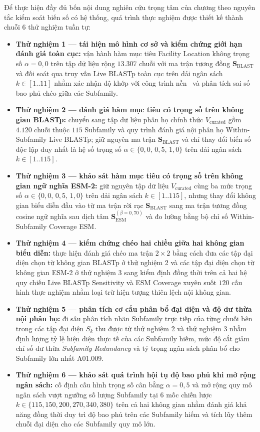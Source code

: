 Để thực hiện đầy đủ bốn nội dung nghiên cứu trọng tâm của chương theo nguyên tắc kiểm soát biến số có hệ thống, quá trình thực nghiệm được thiết kế thành chuỗi 6 thử nghiệm tuần tự:
\begin{itemize}[leftmargin=1.5cm, itemsep=3pt, topsep=4pt]
    \item \textbf{Thử nghiệm 1 --- tái hiện mô hình cơ sở và kiểm chứng giới hạn đánh giá toàn cục:} vận hành hàm mục tiêu Facility Location không trọng số $\alpha = 0{,}0$ trên tập dữ liệu rộng $13.307$ chuỗi với ma trận tương đồng $\mathbf{S}_{\text{BLAST}}$ và đối soát qua truy vấn Live BLASTp toàn cục trên dải ngân sách $k \in [1..11]$ nhằm xác nhận độ khớp với công trình nền~\cite{nguyen2025} và phân tích sai số bao phủ chéo giữa các Subfamily.
    \item \textbf{Thử nghiệm 2 --- đánh giá hàm mục tiêu có trọng số trên không gian BLASTp:} chuyển sang tập dữ liệu phân họ chính thức $V_{\text{curated}}$ gồm $4.120$ chuỗi thuộc $115$ Subfamily và quy trình đánh giá nội phân họ Within-Subfamily Live BLASTp; giữ nguyên ma trận $\mathbf{S}_{\text{BLAST}}$ và chỉ thay đổi biến số độc lập duy nhất là hệ số trọng số $\alpha \in \{0{,}0, \, 0{,}5, \, 1{,}0\}$ trên dải ngân sách $k \in [1..115]$.
    \item \textbf{Thử nghiệm 3 --- khảo sát hàm mục tiêu có trọng số trên không gian ngữ nghĩa ESM-2:} giữ nguyên tập dữ liệu $V_{\text{curated}}$ cùng ba mức trọng số $\alpha \in \{0{,}0, \, 0{,}5, \, 1{,}0\}$ trên dải ngân sách $k \in [1..115]$, nhưng thay đổi không gian biểu diễn đầu vào từ ma trận rời rạc $\mathbf{S}_{\text{BLAST}}$ sang ma trận tương đồng cosine ngữ nghĩa sau dịch tâm $\mathbf{S}_{\text{ESM}}^{(\beta=0{,}70)}$ và đo lường bằng bộ chỉ số Within-Subfamily Coverage ESM.
    \item \textbf{Thử nghiệm 4 --- kiểm chứng chéo hai chiều giữa hai không gian biểu diễn:} thực hiện đánh giá chéo ma trận $2 \times 2$ bằng cách đưa các tập đại diện chọn từ không gian BLASTp ở thử nghiệm 2 và các tập đại diện chọn từ không gian ESM-2 ở thử nghiệm 3 sang kiểm định đồng thời trên cả hai hệ quy chiếu Live BLASTp Sensitivity và ESM Coverage xuyên suốt $120$ cấu hình thực nghiệm nhằm loại trừ hiện tượng thiên lệch nội không gian.
    \item \textbf{Thử nghiệm 5 --- phân tích cơ cấu phân bổ đại diện và độ dư thừa nội phân họ:} đi sâu phân tích nhãn Subfamily trực tiếp của từng chuỗi bên trong các tập đại diện $S_k$ thu được từ thử nghiệm 2 và thử nghiệm 3 nhằm định lượng tỷ lệ hiện diện thực tế của các Subfamily hiếm, mức độ cắt giảm chỉ số dư thừa \textit{Subfamily Redundancy} và tỷ trọng ngân sách phân bổ cho Subfamily lớn nhất A01.009.
    \item \textbf{Thử nghiệm 6 --- khảo sát quá trình hội tụ độ bao phủ khi mở rộng ngân sách:} cố định cấu hình trọng số cân bằng $\alpha = 0{,}5$ và mở rộng quy mô ngân sách vượt ngưỡng số lượng Subfamily tại 6 mốc chiến lược $k \in \{115, 150, 200, 270, 340, 380\}$ trên cả hai không gian nhằm đánh giá khả năng đồng thời duy trì độ bao phủ trên các Subfamily hiếm và tích lũy thêm chuỗi đại diện cho các Subfamily quy mô lớn.
\end{itemize}

